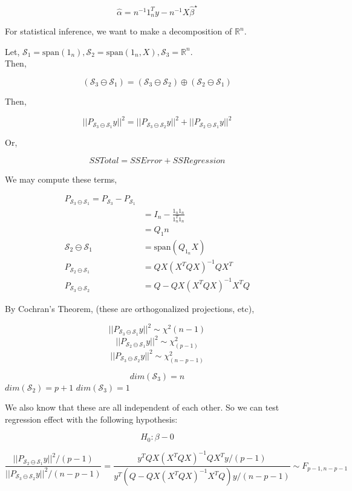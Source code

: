 \documentclass[11pt,fleqn]{book} %
\begin{document}
	$$\hat{\alpha} = n^{-1} 1^T_n y - n^{-1}X \hat{\beta}^\star $$

	For statistical inference, we want to make a decomposition of $\mathbb{R}^n$.

	Let, $\mathscr{S}_1 = \text{span}(1_n), \mathscr{S}_2 = \text{span}(1_n, X), \mathscr{S}_3 = \mathbb{R}^n$. \\

	Then,

	$$(\mathscr{S}_3 \ominus \mathscr{S}_1) = (\mathscr{S}_3 \ominus \mathscr{S}_2) \oplus (\mathscr{S}_2 \ominus \mathscr{S}_1) $$

	Then, 

	$$||P_{\mathscr{S}_3 \ominus \mathscr{S}_1}y||^2 = ||P_{\mathscr{S}_3 \ominus \mathscr{S}_2}y||^2 + ||P_{\mathscr{S}_2 \ominus \mathscr{S}_1}y||^2 $$

	Or, 

	$$SSTotal = SSError + SSRegression $$ 

	We may compute these terms, 

	\begin{align*}
		P_{\mathscr{S}_3 \ominus \mathscr{S}_1} =  P_{\mathscr{S}_3} - P_{\mathscr{S}_1}\\
			&= I_n - \frac{1_n1_n}{1_n^T1_n}\\
			&= Q_1n\\
		\mathscr{S}_2 \ominus \mathscr{S}_1	&= \text{span}(Q_{1_n}X)\\
		P_{\mathscr{S}_2 \ominus \mathscr{S}_1} &= QX(X^TQX)^{-1}QX^T\\
		P_{\mathscr{S}_3 \ominus \mathscr{S}_2}&= Q - QX(X^TQX)^{-1}X^TQ
	\end{align*}

By Cochran's Theorem, (these are orthogonalized projections, etc), 

$$ ||P_{\mathscr{S}_3 \ominus \mathscr{S}_1}y||^2 \sim \chi^2{(n-1)} $$
$$ ||P_{\mathscr{S}_2 \ominus \mathscr{S}_1}y||^2 \sim \chi^2_{(p-1)} $$
$$ ||P_{\mathscr{S}_3 \ominus \mathscr{S}_2}y||^2 \sim \chi^2_{(n - p - 1)} $$

\begin{remark}
	$$dim(\mathscr{S}_3) = n$$
	$dim(\mathscr{S}_2) = p+1$
	$dim(\mathscr{S}_3) = 1$
\end{remark}

We also know that these are all independent of each other. So we can test regression effect with the following hypothesis:

$$H_0: \beta - 0 $$


$$\frac{||P_{\mathscr{S}_2 \ominus \mathscr{S}_1}y||^2 / (p-1)}{||P_{\mathscr{S}_3 \ominus \mathscr{S}_2}y||^2 / (n-p - 1)} = \frac{y^T QX(X^TQX)^{-1}QX^T y /(p-1)}{y^T (Q - QX(X^TQX)^{-1}X^TQ) y / (n-p - 1)} \sim F_{p-1, n - p - 1} $$
\end{document}
